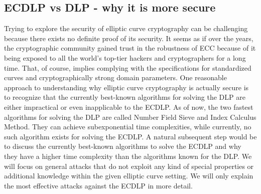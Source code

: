 \subsection{ECDLP vs DLP - why it is more secure}\label{sec:ecdlp_vs_dlp}
Trying to explore the security of elliptic curve cryptography can be challenging because there exists no definite proof of its security. It seems as if over the years, the cryptographic community gained trust in the robustness of ECC because of it being exposed to all the world's top-tier hackers and cryptographers for a long time. That, of course, implies complying with the specifications for standardized curves and cryptographically strong domain parameters\cite{bsi_ecdsa}. One reasonable approach to understanding why elliptic curve cryptography is actually secure is to recognize that the currently best-known algorithms for solving the DLP are either impractical or even inapplicable to the ECDLP. As of now, the two fastest algorithms for solving the DLP are called Number Field Sieve and Index Calculus Method. They can achieve subexponential time complexities\cite{10.1145/100216.100295}\cite{PADMAVATHY2012161}, while currently, no such algorithm exists for solving the ECDLP. A natural subsequent step would be to discuss the currently best-known algorithms to solve the ECDLP and why they have a higher time complexity than the algorithms known for the DLP. We will focus on general attacks that do not exploit any kind of special properties or additional knowledge within the given elliptic curve setting. We will only explain the most effective attacks against the ECDLP in more detail.

